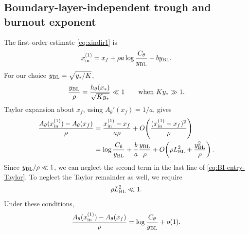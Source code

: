 \documentclass[11pt]{article}
\newcommand{\rhoeps}{\rho}
\newcommand{\hth}{h_\theta}
\newcommand{\xf}{x_f}
\newcommand{\xs}{x_*}
\newcommand{\yin}{y_{\rm BL}}
\newcommand{\Cth}{C_\theta}
\newcommand{\Ath}{A_\theta}
\begin{document}
\subsection{Boundary-layer-independent trough and burnout exponent}
The first-order estimate \cref{eq:xindir1} is
\begin{equation}
x_{\rm in}^{(1)}
=\xf+\rhoeps a\log\frac{\Cth}{\yin}+b\yin.
\label{eq:BI-entry-repeat}
\end{equation}
For our choice \(\yin=\sqrt{y_*/K}\),
\begin{equation}
\frac{\yin}{\rhoeps}
=\frac{\hth(\xs)}{\sqrt{Ky_*}}\ll1
\qquad\text{when }Ky_*\gg1.
\label{eq:BI-height-scale}
\end{equation}
Taylor expansion about \(\xf\), using \(\Ath'(\xf)=1/a\), gives
\begin{equation}
\begin{aligned}
\frac{\Ath(x_{\rm in}^{(1)})-\Ath(\xf)}{\rhoeps}
&=\frac{x_{\rm in}^{(1)}-\xf}{a\rhoeps}
+O\!\left(\frac{(x_{\rm in}^{(1)}-\xf)^2}{\rhoeps}\right)\\
&=\log\frac{\Cth}{\yin}+\frac ba\frac{\yin}{\rhoeps}
+O\!\left(\rhoeps L_{\rm BL}^2+\frac{\yin^2}{\rhoeps}\right).
\end{aligned}
\label{eq:BI-entry-Taylor}
\end{equation}
Since \(\yin/\rhoeps\ll1\), we can neglect the second term in the last line of \cref{eq:BI-entry-Taylor}. To neglect the Taylor remainder as well, we require
\begin{equation}
\rhoeps L_{\rm BL}^2\ll1.
\label{eq:BI-log-condition}
\end{equation}
Under these conditions,
\begin{equation}
\frac{\Ath(x_{\rm in}^{(1)})-\Ath(\xf)}{\rhoeps}
=\log\frac{\Cth}{\yin}+o(1).
\label{eq:BIaction}
\end{equation}
\end{document}
